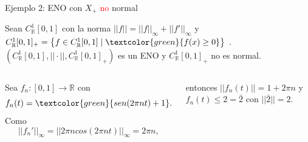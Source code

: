 


\begin{frame}{Ejemplo 2: ENO con $X_{+}$ \textcolor{red}{no} normal}

\begin{block}{}
	Sean $C_{\mathbb{R}}^{1} [0,1] $ con   la norma  $  || f || =  || f ||_{\infty} +  || {f}' ||_{\infty}  $  y $C_{\mathbb{R}}^{1} [0,1]_{+} =\left\lbrace f \in C_{\mathbb{R}}^{1} [0,1] \mid \textcolor{green}{f(x) \geq 0} \right\rbrace  $ . $ ( C_{\mathbb{R}}^{1} [0,1], || \cdot || , C_{\mathbb{R}}^{1} [0,1]_{+} ) $ es un ENO y $C_{\mathbb{R}}^{1} [0,1]_{+}$ no  es normal.
\end{block}
\begin{columns}


	Sea $f_{n} : [0,1] \longrightarrow \mathbb{R}  $ con	$$ f_{n}(t) = \textcolor{green}{sen(2 \pi n  t) + 1} . $$  Como $$ ||{f_{n}}'||_{\infty} = || 2 \pi n cos( 2 \pi n t) ||_{\infty}   =  2 \pi n  ,$$ 
	
	entonces $|| f_{n} (t) ||= 1+  2 \pi n$ \hspace{2cm} y\\ $f_{n} (t) \leq 2 = \bar{2}$ con $ || \bar{2} || = 2  . $
	 


 
\end{columns} 
    

\end{frame}






